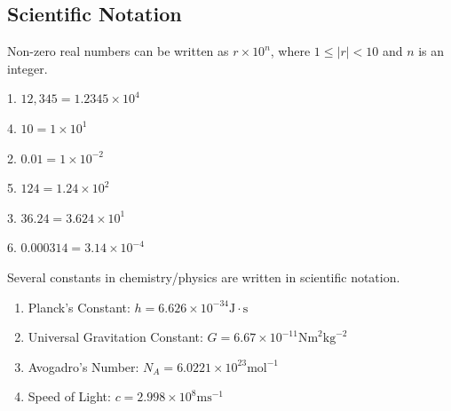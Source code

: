 \documentclass[crop=false,class=book,oneside]{standalone}
\begin{document}
    \subsection{Scientific Notation}
        Non-zero real numbers can be written as
        ${r}\times{10^{n}}$, where ${1}\leq{|r|}<10$
        and $n$ is an integer.
        \begin{fexample}{}{}
            \begin{enumerate}
                \begin{multicols}{3}
                    \item[1.] $12,\!345={1.2345}\times{10^{4}}$
                    \item[4.] $10={1}\times{10^{1}}$
                    \item[2.] $0.01={1}\times{10^{-2}}$
                    \item[5.] $124={1.24}\times{10^{2}}$
                    \item[3.] $36.24={3.624}\times{10^{1}}$
                    \item[6.] $0.000314={3.14}\times{10^{-4}}$
                \end{multicols}
            \end{enumerate}
            Several constants in chemistry/physics are
            written in scientific notation.
            \begin{enumerate}
                \item Planck's Constant:
                    $h={6.626}\times{10^{-34}}%
                    \textrm{J}\cdot\textrm{s}$
                \item Universal Gravitation Constant:
                    $G={6.67}\times{10^{-11}}%
                    \textrm{Nm}^{2}\textrm{kg}^{-2}$
                \item Avogadro's Number:
                    $N_{A}={6.0221}\times{10^{23}}%
                    \textrm{mol}^{-1}$
                \item Speed of Light:
                    $c={2.998}\times{10^{8}\textrm{ms}^{-1}}$
            \end{enumerate}
        \end{fexample}
\end{document}
